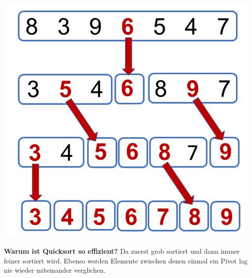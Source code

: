 \documentclass[12pt,a4paper]{article}
\begin{document}
\begin{minipage}[c]{0.4\textwidth}
	\begin{center}
		\includegraphics[scale=0.18]{Bilder/quicksort.jpeg}		
	\end{center}
\end{minipage}
\vspace*{0.7cm}
\newline
\textbf{Warum ist Quicksort so effizient?}\newline
Da zuerst grob sortiert und dann immer feiner sortiert wird. Ebenso werden Elemente zwischen denen einmal ein Pivot lag nie wieder miteinander verglichen. 
\end{document}
